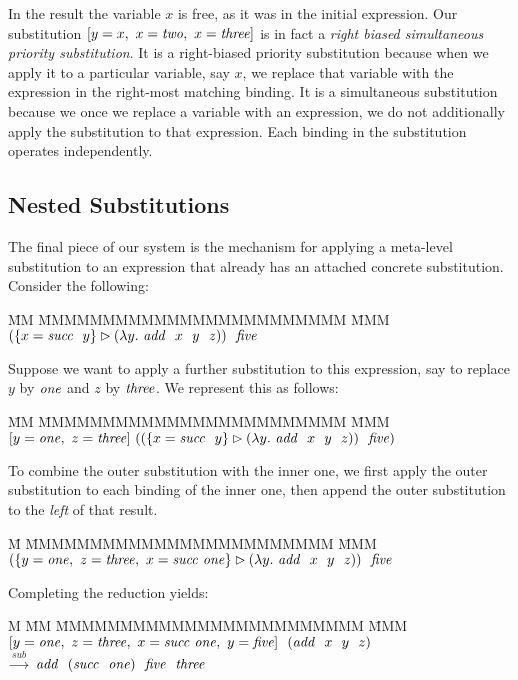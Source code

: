 %
In the result the variable $x$ is free, as it was in the initial expression. Our substitution $[y = x,~ x = \mathit{two},~ x = \mathit{three}]$ is in fact a \emph{right biased simultaneous priority substitution}. It is a right-biased priority substitution because when we apply it to a particular variable, say $x$, we replace that variable with the expression in the right-most matching binding. It is a simultaneous substitution because we once we replace a variable with an expression, we do not additionally apply the substitution to that expression. Each binding in the substitution operates independently.


\subsection{Nested Substitutions}
\label{s:NestedSubstitutions}
The final piece of our system is the mechanism for applying a meta-level substitution to an expression that already has an attached concrete substitution. Consider the following:
\begin{tabbing}
\= MM \= MMMMMMMMMMMMMMMMMMMMMMMM \= MMM \kill
        \>
        \> $(\{x = \mathit{succ}~~ y\} \rhd (\lambda y.~ \mathit{add}~~ x~~ y~~ z))~~ \mathit{five}$
\end{tabbing}

Suppose we want to apply a further substitution to this expression, say to replace $y$ by $\mathit{one}$ and $z$ by $\mathit{three}$. We represent this as follows:
\begin{tabbing}
\= MM \= MMMMMMMMMMMMMMMMMMMMMMMM \= MMM \kill
        \> 
        \> $[y = \mathit{one},~ z = \mathit{three}] 
                ~((\{x = \mathit{succ}~~ y\} \rhd (\lambda y.~ \mathit{add}~~ x~~ y~~ z))~~ \mathit{five})$
\end{tabbing}

To combine the outer substitution with the inner one, we first apply the outer substitution to each binding of the inner one, then append the outer substitution to the \emph{left} of that result.
\begin{tabbing}
\= M \= MMMMMMMMMMMMMMMMMMMMMMMM \= MMM \kill
        \> 
        \> $(\{y = \mathit{one},~ z = \mathit{three},~ x = \mathit{succ}~ \mathit{one}\}
                \rhd (\lambda y.~ \mathit{add}~~ x~~ y~~ z))~~ \mathit{five}$
\end{tabbing}

Completing the reduction yields:
\begin{tabbing}
M \= MM   \= MMMMMMMMMMMMMMMMMMMMMMMM \= MMM \kill
        \>
        \> $[y = \mathit{one},~ z = \mathit{three},~ x = \mathit{succ}~ \mathit{one},~ y = \mathit{five}] 
                ~~ (\mathit{add}~~ x~~ y~~ z)$
\\
        \> $\stackrel{sub}{\longrightarrow}$
        \> $\mathit{add}~~ (\mathit{succ}~~ \mathit{one})~~ \mathit{five}~~ \mathit{three}$
\end{tabbing}

